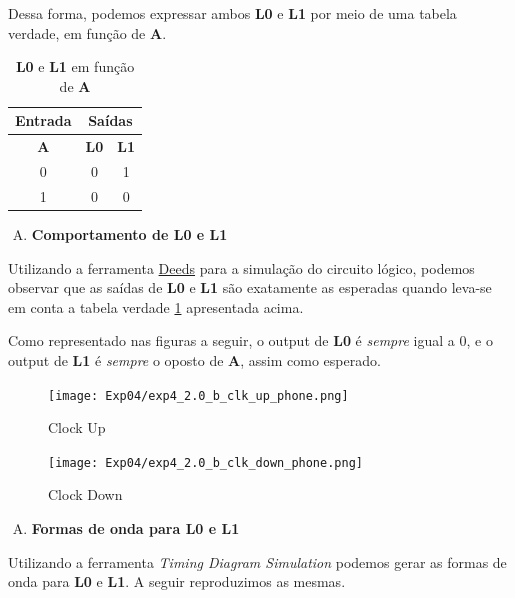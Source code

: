 \documentclass[12pt]{article}
\begin{document}
Dessa forma, podemos expressar ambos \textbf{L0} e \textbf{L1} por meio de uma
tabela verdade, em função de \textbf{A}.

\begin{table}[H]
    \centering
    \caption{\textbf{L0} e \textbf{L1} em função de \textbf{A}}
    \begin{tabular}{|c|c|c|}\hline
        \multicolumn{1}{|c|}{Entrada} & \multicolumn{2}{|c|}{Saídas} \\\hline
        \textbf{A} & \textbf{L0} & \textbf{L1} \\\hline
        0 & 0 & 1 \\\hline
        1 & 0 & 0 \\\hline
    \end{tabular}\label{tab:atraso_de_propagação:L0_L1}
\end{table}

\begin{enumerate}[B)]
\item \textbf{Comportamento de L0 e L1}
\end{enumerate}

Utilizando a ferramenta
\href{https://www.digitalelectronicsdeeds.com/deeds.html}{Deeds} para a
simulação do circuito lógico, podemos observar que as saídas de \textbf{L0} e
\textbf{L1} são exatamente as esperadas quando leva-se em conta a tabela verdade
\ref{tab:atraso_de_propagação:L0_L1} apresentada acima.

Como representado nas figuras a seguir, o output de \textbf{L0} é \emph{sempre}
igual a $0$, e o output de \textbf{L1} é \emph{sempre} o oposto de \textbf{A},
assim como esperado.

\begin{figure}[H]
    \centering
    \texttt{[image: Exp04/exp4\_2.0\_b\_clk\_up\_phone.png]}
    \caption{Clock Up}\label{fig:exp4_2.0_b_clk_up_phone.png}
\end{figure}

\begin{figure}[H]
    \centering
    \texttt{[image: Exp04/exp4\_2.0\_b\_clk\_down\_phone.png]}
    \caption{Clock Down}\label{fig:exp4_2.0_b_clk_down_phone.png}
\end{figure}

\begin{enumerate}[C)]
\item \textbf{Formas de onda para L0 e L1}
\end{enumerate}

Utilizando a ferramenta \emph{Timing Diagram Simulation} podemos gerar as
formas de onda para \textbf{L0} e \textbf{L1}. A seguir reproduzimos as mesmas.
\end{document}
